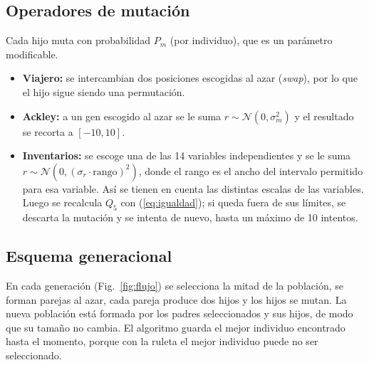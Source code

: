 \documentclass[conference]{IEEEtran}
\begin{document}
\subsection{Operadores de mutaci\'on}
Cada hijo muta con probabilidad $P_m$ (por individuo), que es un par\'ametro modificable.
\begin{itemize}
\item \textbf{Viajero:} se intercambian dos posiciones escogidas al azar (\emph{swap}), por lo que el hijo sigue siendo una permutaci\'on.
\item \textbf{Ackley:} a un gen escogido al azar se le suma $r\sim\mathcal{N}(0,\sigma_m^2)$ y el resultado se recorta a $[-10,10]$.
\item \textbf{Inventarios:} se escoge una de las 14 variables independientes y se le suma $r\sim\mathcal{N}(0,(\sigma_r\cdot\text{rango})^2)$, donde el rango es el ancho del intervalo permitido para esa variable. As\'i se tienen en cuenta las distintas escalas de las variables. Luego se recalcula $Q_5$ con (\ref{eq:igualdad}); si queda fuera de sus l\'imites, se descarta la mutaci\'on y se intenta de nuevo, hasta un m\'aximo de 10 intentos.
\end{itemize}

\subsection{Esquema generacional}
En cada generaci\'on (Fig.~\ref{fig:flujo}) se selecciona la mitad de la poblaci\'on, se forman parejas al azar, cada pareja produce dos hijos y los hijos se mutan. La nueva poblaci\'on est\'a formada por los padres seleccionados y sus hijos, de modo que su tama\~no no cambia. El algoritmo guarda el mejor individuo encontrado hasta el momento, porque con la ruleta el mejor individuo puede no ser seleccionado.
\end{document}
